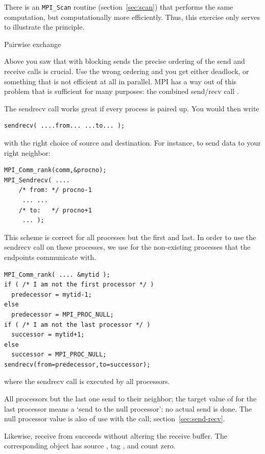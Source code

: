 \begin{remark}
  There is an \lstinline{MPI_Scan} routine (section~\ref{sec:scan})
  that performs the same computation,
  but computationally more efficiently. Thus, this exercise only serves to illustrate
  the principle.
\end{remark}


 {Pairwise exchange}
\label{sec:send-recv}

Above you saw that with blocking sends the precise ordering of the
send and receive calls is crucial. Use the wrong ordering and you get
either deadlock, or something that is not efficient at all in
parallel. MPI has a way out of this problem that is sufficient for
many purposes: the combined send/recv call .

The sendrecv call works great if every process is paired up.
You would then write
\begin{lstlisting}
sendrecv( ....from... ...to... );
\end{lstlisting}
with the right choice of source and destination. For instance, to send
data to your right neighbor:
\begin{lstlisting}
MPI_Comm_rank(comm,&procno);
MPI_Sendrecv( .... 
    /* from: */ procno-1
     ... ... 
    /* to:   */ procno+1
     ... );
\end{lstlisting}
This scheme is correct for all processes but the first and last. 
In order to use the sendrecv call on these processes,
we use  for the non-existing
processes that the endpoints communicate with.
\begin{lstlisting}
MPI_Comm_rank( .... &mytid );
if ( /* I am not the first processor */ )
  predecessor = mytid-1;
else
  predecessor = MPI_PROC_NULL;
if ( /* I am not the last processor */ )
  successor = mytid+1;
else
  successor = MPI_PROC_NULL;
sendrecv(from=predecessor,to=successor);
\end{lstlisting}
where the sendrecv call is executed by all processors.

All processors but the last one send to their neighbor; the target
value of  for
the last processor means a `send to the null processor': no actual
send is done. 
The null processor value is also of use with the
 call; section~\ref{sec:send-recv}.

Likewise, receive from  succeeds without
altering the receive buffer.  The corresponding
 object has source
, tag , and
count zero.

